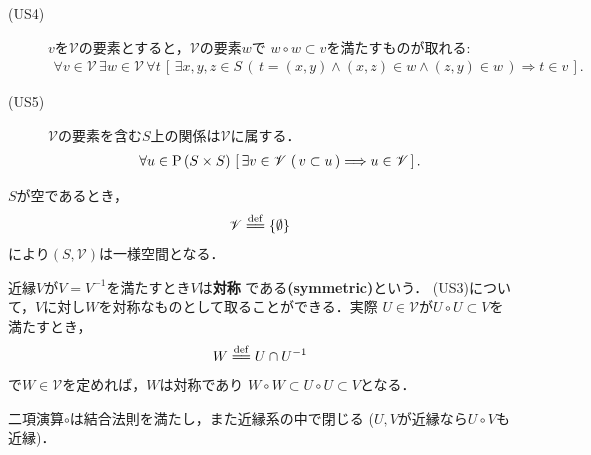 \begin{screen}
\begin{dfn}[近縁系]
\begin{description}
				\item[(US4)] $v$を$\mathscr{V}$の要素とすると，$\mathscr{V}$の要素$w$で
					$w \circ w \subset v$を満たすものが取れる:
					\begin{align}
						\forall v \in \mathscr{V}\, 
						\exists w \in \mathscr{V}\,
						\forall t\, \left[\, \exists x,y,z \in S\, (\, t=(x,y) \wedge (x,z) \in w \wedge (z,y) \in w\, )
						\Longrightarrow t \in v\, \right]. 
					\end{align}
					
				\item[(US5)] $\mathscr{V}$の要素を含む$S$上の関係は$\mathscr{V}$に属する．
					\begin{align}
						\forall u \in \operatorname*{P} \left(S \times S\right)\,
						\left[\, \exists v \in \mathscr{V}\, \left(\, v \subset u\, \right)
						\Longrightarrow u \in \mathscr{V}\, \right].
					\end{align}
			\end{description}
		\end{dfn}
	\end{screen}
	
	$S$が空であるとき，
	\begin{align}
		\mathscr{V} \defeq \{\emptyset\}
	\end{align}
	により$(S,\mathscr{V})$は一様空間となる．
	
			近縁$V$が$V = V^{-1}$を満たすとき$V$は{\bf 対称}
			である{\bf (symmetric)}という．
	(US3)について，$V$に対し$W$を対称なものとして取ることができる．実際
	$U \in \mathscr{V}$が$U \circ U \subset V$を満たすとき，
	\begin{align}
		W \defeq U \cap U^{-1}
	\end{align}
	で$W \in \mathscr{V}$を定めれば，$W$は対称であり
	$W \circ W \subset U \circ U \subset V$となる．
	
	\begin{screen}
		\begin{thm}
		\label{thm:uniform_structure_is_a_semigroup}
			二項演算$\circ$は結合法則を満たし，また近縁系の中で閉じる
			($U,V$が近縁なら$U \circ V$も近縁)．
		\end{thm}
	\end{screen}
	
